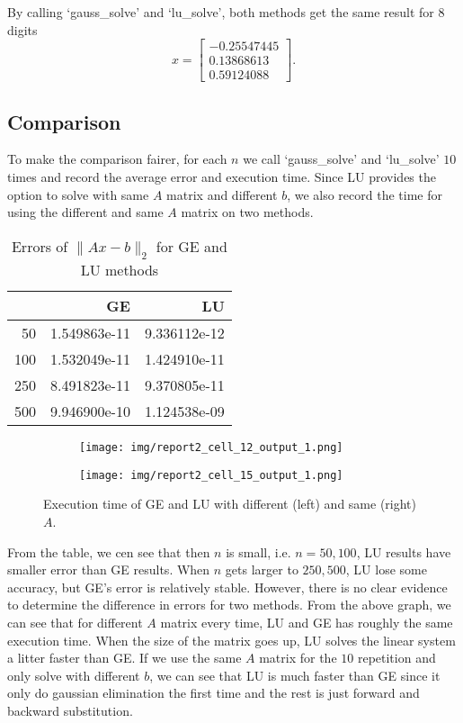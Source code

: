 \documentclass[a4paper,12pt]{article}
\begin{document}
By calling `gauss\_solve' and `lu\_solve',
both methods get the same result for 8 digits
$$
x = \begin{bmatrix}
	-0.25547445  \\
	0.13868613  \\
	0.59124088
\end{bmatrix}.
$$

\subsection{Comparison}
To make the comparison fairer,
for each $n$ we call `gauss\_solve' and `lu\_solve' $10$ times
and record the average error and execution time.
Since LU provides the option to solve with same $A$ matrix and different $b$,
we also record the time for using the different and same $A$ matrix on two methods.

\begin{table}[H]
\begin{center}
	\begin{tabular}{rrr}
	\toprule
	{ } &           GE &           LU \\
	\midrule
	 50 & 1.549863e-11 & 9.336112e-12 \\
	100 & 1.532049e-11 & 1.424910e-11 \\
	250 & 8.491823e-11 & 9.370805e-11 \\
	500 & 9.946900e-10 & 1.124538e-09 \\
	\bottomrule
	\end{tabular}
	\caption{Errors of $\| Ax - b\|_{2}$ for GE and LU methods}
\end{center}
\end{table}


\begin{figure}[H]
    \centering
	\begin{subfigure}[b]{0.49\textwidth}
	    \centering
	    \texttt{[image: img/report2\_cell\_12\_output\_1.png]}
	    \label{fig:0}
	\end{subfigure}
	\hfill
	\begin{subfigure}[b]{0.49\textwidth}
	    \centering
	     \texttt{[image: img/report2\_cell\_15\_output\_1.png]}
	     \label{fig:1}
	\end{subfigure}
	\caption{Execution time of GE and LU with different (left) and same (right) $A$.}
\end{figure}


From the table, we cen see that then $n$ is small, i.e. $n = 50, 100$,
LU results have smaller error than GE results.
When $n$ gets larger to $250, 500$,
LU lose some accuracy, but GE's error is relatively stable.
However, there is no clear evidence to determine the difference in errors for two methods.
From the above  graph, we can see that for different $A$ matrix every time,
LU and GE has roughly the same execution time.
When the size of the matrix goes up, LU solves the linear system a litter faster than GE.
If we use the same $A$ matrix for the $10$ repetition and only solve with different $b$,
we can see that LU is much faster than GE
since it only do gaussian elimination the first time and the rest is just forward and backward substitution.
\end{document}
